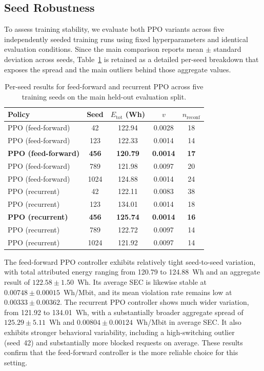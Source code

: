 \documentclass[a4paper,fleqn]{cas-sc}
\begin{document}
\subsection{Seed Robustness}
\label{subsec:seed_robustness}

To assess training stability, we evaluate both PPO variants across five independently seeded training runs using fixed hyperparameters and identical evaluation conditions. Since the main comparison reports mean $\pm$ standard deviation across seeds, Table~\ref{tab:seed_robustness} is retained as a detailed per-seed breakdown that exposes the spread and the main outliers behind those aggregate values.

\begin{table}[width=.9\linewidth,cols=5,pos=h]
\centering
\caption{Per-seed results for feed-forward and recurrent PPO across five training seeds on the main held-out evaluation split.}
\label{tab:seed_robustness}
\begin{tabular}{l c c c c}
\hline
Policy & Seed & $E_{\mathrm{tot}}$ (Wh) & $v$ & $n_{\mathrm{reconf}}$ \\
\hline
PPO (feed-forward) & 42   & 122.94 & 0.0028 & 18 \\
PPO (feed-forward) & 123  & 122.33 & 0.0014 & 14 \\
\textbf{PPO (feed-forward)} & \textbf{456}  & \textbf{120.79} & \textbf{0.0014} & \textbf{17} \\
PPO (feed-forward) & 789  & 121.98 & 0.0097 & 20 \\
PPO (feed-forward) & 1024 & 124.88 & 0.0014 & 24 \\
\hline
PPO (recurrent)    & 42   & 122.11 & 0.0083 & 38 \\
PPO (recurrent)    & 123  & 134.01 & 0.0014 & 18 \\
\textbf{PPO (recurrent)} & \textbf{456}  & \textbf{125.74} & \textbf{0.0014} & \textbf{16} \\
PPO (recurrent)    & 789  & 122.72 & 0.0097 & 14 \\
PPO (recurrent)    & 1024 & 121.92 & 0.0097 & 14 \\
\hline
\end{tabular}
\end{table}

The feed-forward PPO controller exhibits relatively tight seed-to-seed variation, with total attributed energy ranging from 120.79 to 124.88~Wh and an aggregate result of $122.58 \pm 1.50$~Wh. Its average SEC is likewise stable at $0.00748 \pm 0.00015$~Wh/Mbit, and its mean violation rate remains low at $0.00333 \pm 0.00362$. The recurrent PPO controller shows much wider variation, from 121.92 to 134.01~Wh, with a substantially broader aggregate spread of $125.29 \pm 5.11$~Wh and $0.00804 \pm 0.00124$~Wh/Mbit in average SEC. It also exhibits stronger behavioral variability, including a high-switching outlier (seed~42) and substantially more blocked requests on average. These results confirm that the feed-forward controller is the more reliable choice for this setting.
\end{document}
